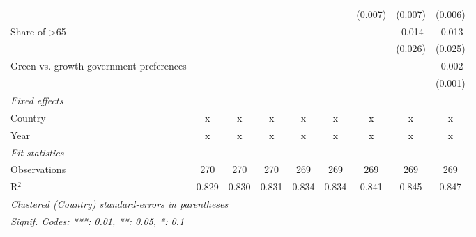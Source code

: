 \begin{table}[htbp]
\begin{tabular}{lcccccccc}
                                                  &         &         &         &         &         & (0.007) & (0.007) & (0.006)\\   
      Share of >65                                &         &         &         &         &         &         & -0.014  & -0.013\\   
                                                  &         &         &         &         &         &         & (0.026) & (0.025)\\   
      Green vs. growth government preferences     &         &         &         &         &         &         &         & -0.002\\   
                                                  &         &         &         &         &         &         &         & (0.001)\\   
      \emph{Fixed effects}\\
      Country                                     & x       & x       & x       & x       & x       & x       & x       & x\\  
      Year                                        & x       & x       & x       & x       & x       & x       & x       & x\\  
      \midrule \emph{Fit statistics}\\
      Observations                                & 270     & 270     & 270     & 269     & 269     & 269     & 269     & 269\\  
      R$^2$                                       & 0.829   & 0.830   & 0.831   & 0.834   & 0.834   & 0.841   & 0.845   & 0.847\\  
      \midrule
      \multicolumn{9}{l}{\emph{Clustered (Country) standard-errors in parentheses}}\\
      \multicolumn{9}{l}{\emph{Signif. Codes: ***: 0.01, **: 0.05, *: 0.1}}\\
   \end{tabular}
\end{table}


